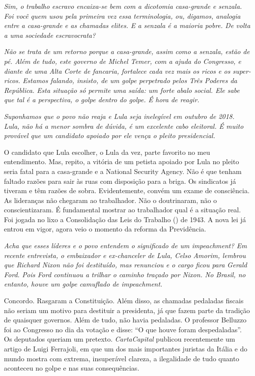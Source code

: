 \itshape
Sim, o trabalho escravo encaixa-se bem com a dicotomia
casa-grande e senzala. Foi você quem usou pela primeira vez essa
terminologia, ou, digamos, analogia entre a casa-grande e as chamadas
elites. E a senzala é a maioria pobre. De volta a uma sociedade
escravocrata?

\normalfont 

\itshape
Não se trata de um retorno porque a casa-grande, assim
como a senzala, estão de pé. Além de tudo, este governo de Michel Temer,
com a ajuda do Congresso, e diante de uma Alta Corte de fancaria,
fortalece cada vez mais os ricos e os super-ricos. Estamos falando,
insisto, de um golpe perpetrado pelos Três Poderes da República. Esta
situação só permite uma saída: um forte abalo social. Ele sabe que tal é
a perspectiva, o golpe dentro do golpe. É hora de reagir.

\itshape
Suponhamos que o povo não reaja e Lula seja inelegível
em outubro de 2018. Lula, não há a menor sombra de dúvida, é um
excelente cabo eleitoral. É muito provável que um candidato apoiado por
ele vença o pleito presidencial.

\normalfont 
O candidato que Lula escolher, o Lula da vez, parte
favorito no meu entendimento. Mas, repito, a vitória de um petista
apoiado por Lula no pleito seria fatal para a casa-grande e a National
Security Agency. Não é que tenham faltado razões para sair às ruas com
disposição para a briga. Os sindicatos já tiveram e têm razões de sobra.
Evidentemente, convém um exame de consciência. As lideranças não
chegaram ao trabalhador. Não o doutrinaram, não o conscientizaram. É
fundamental mostrar ao trabalhador qual é a situação real. Foi jogada no
lixo a Consolidação das Leis do Trabalho () de 1943. A nova lei já
entrou em vigor, agora veio o momento da reforma da Previdência.

\itshape
Acha que esses líderes e o povo entendem o significado
de um \emph{impeachment}? Em recente entrevista, o embaixador e
ex-chanceler de Lula, Celso Amorim, lembrou que Richard Nixon não foi
destituído, mas renunciou e o cargo ficou para Gerald Ford. Pois Ford
continuou a trilhar o caminho traçado por Nixon. No Brasil, no entanto,
houve um golpe camuflado de \emph{impeachment}.

\normalfont 
Concordo. Rasgaram a Constituição. Além disso, as
chamadas pedaladas fiscais não seriam um motivo para destituir a
presidenta, já que fazem parte da tradição de quaisquer governos. Além
de tudo, não havia pedaladas. O professor Belluzzo foi ao Congresso no
dia da votação e disse: ``O que houve foram despedaladas''. Os deputados
queriam um pretexto. \emph{CartaCapital} publicou recentemente um artigo
de Luigi Ferrajoli, em que um dos mais importantes juristas da Itália e
do mundo mostra com extrema, insuperável clareza, a ilegalidade de tudo
quanto aconteceu no golpe e nas suas consequências.


